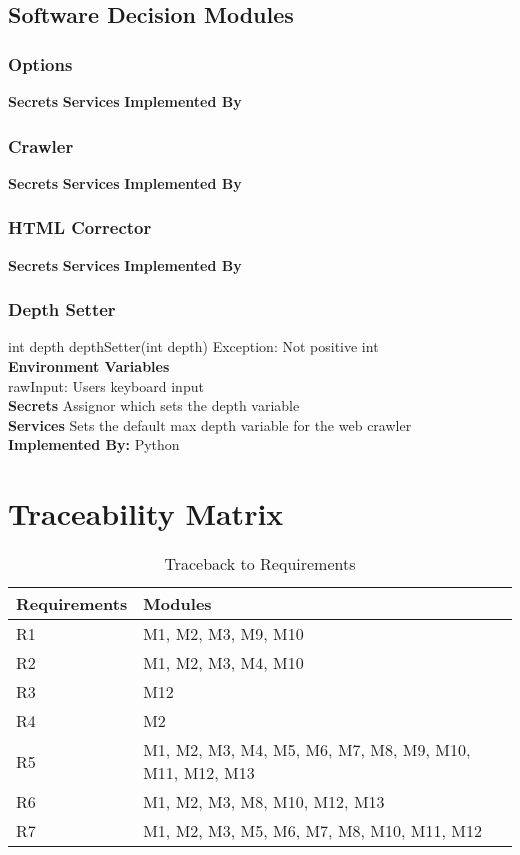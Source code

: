 \documentclass[titlepage]{article}
\begin{document}
\subsection{Software Decision Modules}
\subsubsection{Options}
\textbf{Secrets}
\textbf{Services}
\textbf{Implemented By}
\subsubsection{Crawler}
\textbf{Secrets}
\textbf{Services}
\textbf{Implemented By}
\subsubsection{HTML Corrector}
\textbf{Secrets}
\textbf{Services}
\textbf{Implemented By}

\subsubsection{Depth Setter}
int depth depthSetter(int depth) Exception: Not positive int\\
\textbf{Environment Variables}\\
rawInput: Users keyboard input\\
\textbf{Secrets}
Assignor which sets the depth variable  \\
\textbf{Services}
Sets the default max depth variable for the web crawler\\
\textbf{Implemented By:} Python

\section{Traceability Matrix}
\begin{table}[h!]
\centering
    \begin{tabular}{| p{5cm} | p{5cm} |}    \hline
    Requirements &Modules\\ \hline
    
      R1  &M1, M2, M3, M9, M10 \\ \hline
      R2  &M1, M2, M3, M4, M10 \\ \hline
      R3  &M12 \\ \hline
      R4  &M2 \\ \hline
      R5  &M1, M2, M3, M4, M5, M6, M7, M8, M9, M10, M11, M12, M13 \\ \hline
      R6  &M1, M2, M3, M8, M10, M12, M13 \\ \hline
      R7  &M1, M2, M3, M5, M6, M7, M8, M10, M11, M12 \\ \hline
      
    \end{tabular}
    \caption{Traceback to Requirements}
\label{table:Traceback to Requirements}
\end{table}
\end{document}
